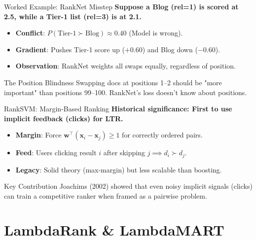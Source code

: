 \documentclass[aspectratio=169]{beamer}
\newif\ifanimated
\newcommand{\cpause}{\ifanimated\pause\fi}
\newcommand{\vx}{\mathbf{x}}
\newcommand{\vw}{\mathbf{w}}
\begin{document}
\begin{frame}{Worked Example: RankNet Misstep}
\textbf{Suppose a Blog (rel=1) is scored at 2.5, while a Tier-1 list (rel=3) is at 2.1.}

\vspace{0.8em}
\begin{itemize}
    \item \textbf{Conflict}: $P(\text{Tier-1} \succ \text{Blog}) \approx 0.40$ (Model is wrong).
    \item \textbf{Gradient}: Pushes Tier-1 score up ($+0.60$) and Blog down ($-0.60$).
    \item \textbf{Observation}: RankNet weights all swaps equally, regardless of position.
\end{itemize}\cpause

\vspace{1em}
\cpause
\begin{alertblock}{The Position Blindness}
Swapping docs at positions 1--2 should be "more important" than positions 99--100. RankNet's loss doesn't know about positions.
\end{alertblock}
\end{frame}

\begin{frame}{RankSVM: Margin-Based Ranking}
\textbf{Historical significance: First to use implicit feedback (clicks) for LTR.}

\vspace{0.8em}
\begin{itemize}
    \item \textbf{Margin}: Force $\vw^\top (\vx_i - \vx_j) \geq 1$ for correctly ordered pairs.
    \item \textbf{Feed}: Users clicking result $i$ after skipping $j \implies d_i \succ d_j$.
    \item \textbf{Legacy}: Solid theory (max-margin) but less scalable than boosting.
\end{itemize}\cpause

\vspace{1em}
\cpause
\begin{exampleblock}{Key Contribution}
Joachims (2002) showed that even noisy implicit signals (clicks) can train a competitive ranker when framed as a pairwise problem.
\end{exampleblock}
\end{frame}

\section{LambdaRank \& LambdaMART}
\end{document}
